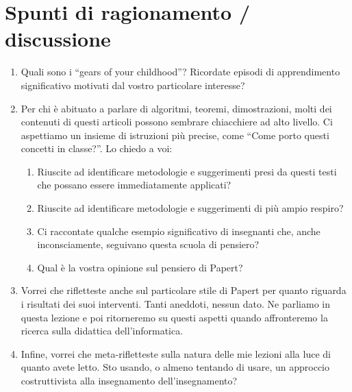 \documentclass[11pt]{article}
\begin{document}
\section{Spunti di ragionamento / discussione} %
\label{sec:spunti_di_ragionamento_discussione}
\begin{enumerate}
	\item Quali sono i “gears of your childhood”? Ricordate episodi di apprendimento significativo motivati dal vostro particolare interesse?
	\item Per chi è abituato a parlare di algoritmi, teoremi, dimostrazioni, molti dei contenuti di questi articoli possono sembrare chiacchiere ad alto livello. Ci aspettiamo un insieme di istruzioni più precise, come “Come porto questi concetti in classe?”. Lo chiedo a voi: \begin{enumerate}
		\item Riuscite ad identificare metodologie e suggerimenti presi da questi testi che possano essere immediatamente applicati?
		\item Riuscite ad identificare metodologie e suggerimenti di più ampio respiro?
		\item Ci raccontate qualche esempio significativo di insegnanti che, anche inconsciamente, seguivano questa scuola di pensiero?
		\item Qual è la vostra opinione sul pensiero di Papert?
	\end{enumerate}
	\item Vorrei che rifletteste anche sul particolare stile di Papert per quanto riguarda i risultati dei suoi interventi. Tanti aneddoti, nessun dato.  Ne parliamo in questa lezione e poi ritorneremo su questi aspetti quando affronteremo la ricerca sulla didattica dell’informatica.
	\item Infine, vorrei che meta-rifletteste sulla natura delle mie lezioni alla luce di quanto avete letto. Sto usando, o almeno tentando di usare, un approccio costruttivista alla insegnamento dell’insegnamento?
\end{enumerate}
\end{document}
